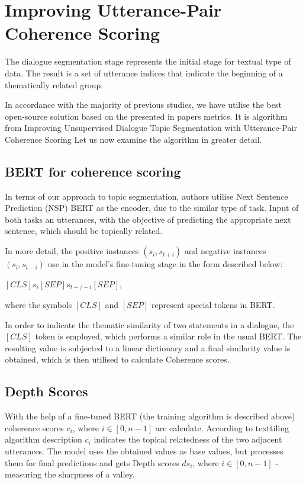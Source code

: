 \documentclass[PMI,VKR]{HSEUniversity}
\begin{document}
\section{Improving Utterance-Pair Coherence Scoring}

The dialogue segmentation stage represents the initial stage for textual type of data. 
The result is a set of utterance indices that indicate the beginning of a thematically related group. 

In accordance with the majority of previous studies, we have utilise the best open-source solution based on the presented in papers metrics. 
It is algorithm from Improving Unsupervised Dialogue Topic Segmentation with Utterance-Pair Coherence Scoring \cite{depthscore:2021} 
Let us now examine the algorithm in greater detail. 

\subsection{BERT for coherence scoring}

In terms of our approach to topic segmentation, authors utilise Next Sentence Prediction (NSP) BERT as the encoder, due to the similar type of task. 
Input of both tasks an utterances, with the objective of predicting the appropriate next sentence, which should be topically related. 

In more detail, the positive instances $(s_{i}, s_{t+i})$ and negative instances $(s_{i}, s_{t-i})$ use in the model's fine-tuning stage in the form described below: 
\begin{center}
    $[CLS] s_{i} [SEP] s_{t+/-i} [SEP]$,
\end{center}
where the symbols $[CLS]$ and $[SEP]$ represent special tokens in BERT. 

In order to indicate the thematic similarity of two statements in a dialogue, the $[CLS]$ token is employed, which performs a similar role in the usual BERT. 
The resulting value is subjected to a linear dictionary and a final similarity value is obtained, which is then utilised to calculate Coherence scores.

\subsection{Depth Scores}

With the help of a fine-tuned BERT (the training algorithm is described above) coherence scores $c_i$, where $i \in [0, n - 1]$ are calculate. According to texttiling algorithm description $c_i$ indicates the topical relatedness of the two adjacent utterances.
The model uses the obtained values as base values, but processes them for final predictions and gets Depth scores $ds_i$, where $i \in [0, n - 1]$  - measuring the sharpness of a valley.
\end{document}
